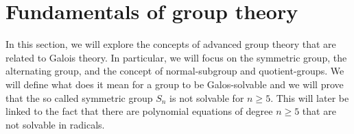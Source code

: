 \section{Fundamentals of group theory}
In this section, we will explore the concepts of advanced group theory that are related to 
Galois theory. In particular, we will focus on the symmetric group, the alternating group, and the
concept of normal-subgroup and quotient-groups. We will define what does it mean for a group to be 
Galos-solvable and we will prove that the so called symmetric group $S_n$ is not solvable for $n \geq 5$. This 
will later be linked to the fact that there are polynomial equations of degree $n \geq 5$ 
that are not solvable in radicals.






